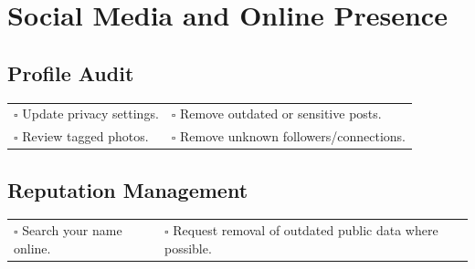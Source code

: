 
\section{Social Media and Online Presence}
\label{sec:social}

\subsection{Profile Audit}

\begin{tabular}{p{9cm} p{8cm}}
$\square$ Update privacy settings. & $\square$ Remove outdated or sensitive posts. \\ 
$\square$ Review tagged photos. & $\square$ Remove unknown followers/connections. \\ 
\end{tabular}

\subsection{Reputation Management}

\begin{tabular}{p{9cm} p{8cm}}
$\square$ Search your name online. & $\square$ Request removal of outdated public data where possible. \\ 
\end{tabular}

